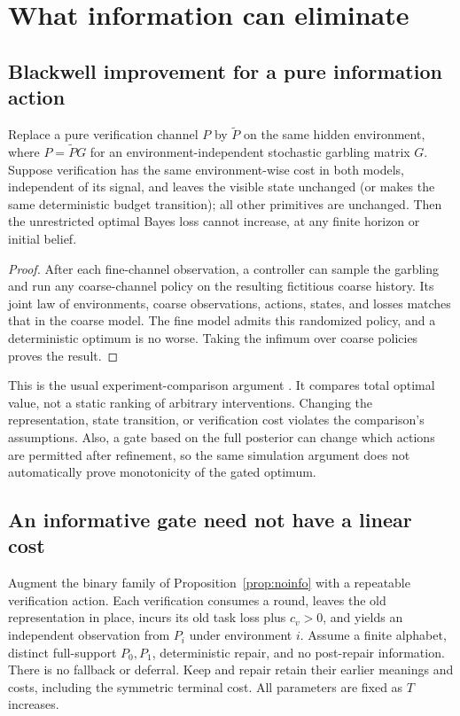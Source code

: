 \section{What information can eliminate}
\label{sec:information}
\subsection{Blackwell improvement for a pure information action}
\begin{proposition}
\label{prop:blackwell}
Replace a pure verification channel $P$ by $\widetilde P$ on the same hidden
environment, where $P=\widetilde P G$ for an environment-independent stochastic
garbling matrix $G$. Suppose verification has the same environment-wise cost
in both models, independent of its signal, and leaves the visible state unchanged
(or makes the same deterministic budget transition); all other primitives are
unchanged. Then the unrestricted optimal
Bayes loss cannot increase, at any finite horizon or initial belief.
\end{proposition}
\begin{proof}
After each fine-channel observation, a controller can sample the garbling and
run any coarse-channel policy on the resulting fictitious coarse history. Its
joint law of environments, coarse observations, actions, states, and losses
matches that in the coarse model. The fine model admits this randomized policy,
and a deterministic optimum is no worse. Taking the infimum over coarse policies
proves the result.
\end{proof}
This is the usual experiment-comparison argument \citep{blackwell1953}.
It compares total optimal value, not a static ranking of arbitrary interventions.
Changing the representation, state transition, or verification cost violates
the comparison's assumptions. Also, a gate based on the full posterior can
change which actions are permitted after refinement, so the same simulation
argument does not automatically prove monotonicity of the gated optimum.

\subsection{An informative gate need not have a linear cost}
Augment the binary family of Proposition~\ref{prop:noinfo} with a repeatable
verification action. Each verification consumes a round, leaves the old
representation in place, incurs its old task loss plus $c_v>0$, and yields an
independent observation from $P_i$ under environment $i$. Assume a finite
alphabet, distinct full-support $P_0,P_1$, deterministic repair, and no
post-repair information. There is no fallback or deferral. Keep and repair
retain their earlier meanings and costs, including the symmetric terminal cost.
All parameters are fixed as $T$ increases.

